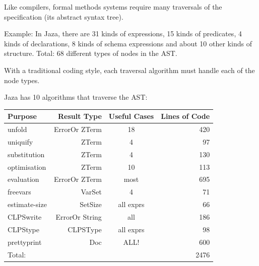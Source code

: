 \begin{slide}
\end{slide}



\begin{slide}

Like compilers, formal methods systems require many
traversals of the specification (its abstract syntax tree).

Example: In Jaza, there are 31 kinds of expressions, 15 kinds of
predicates, 4 kinds of declarations, 8 kinds of schema expressions
and about 10 other kinds of structure.  Total: 68 different types of
nodes in the AST.

With a traditional coding style, each traversal algorithm must
handle each of the node types.
 
Jaza has 10 algorithms that traverse the AST:
\end{slide}
\begin{slide}
{
\begin{tabular}{lrcr}
Purpose         & Result Type   & Useful Cases& Lines of Code \\
\hline
unfold          & ErrorOr ZTerm & 18         & 420 \\%
uniquify        & ZTerm         & 4          & 97  \\%
substitution    & ZTerm         & 4          & 130 \\%
optimisation    & ZTerm         & 10         & 113 \\%
evaluation      & ErrorOr ZTerm & most       & 695 \\
\hline
freevars        & VarSet        & 4          & 71  \\
estimate-size   & SetSize       & all exprs  & 66  \\ 
CLPSwrite       & ErrorOr String& all        & 186 \\
CLPStype        & CLPSType      & all exprs  & 98  \\
prettyprint     & Doc           & ALL!       & 600 \\
\hline
Total:          &               &            & 2476 \\
\hline
\end{tabular}
}
\end{slide}

